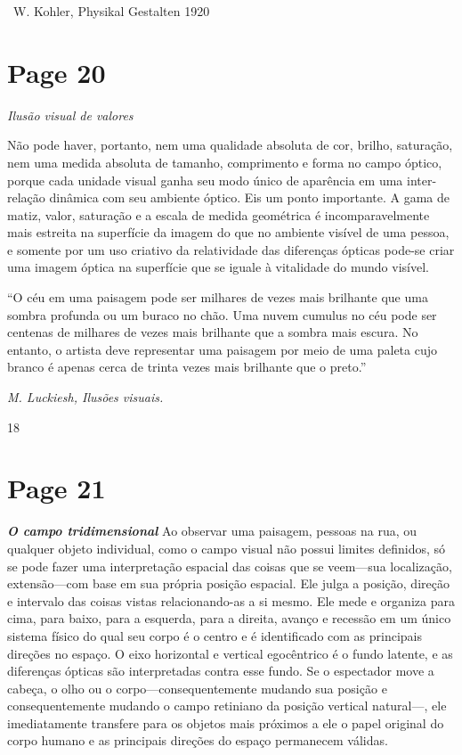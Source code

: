 \documentclass[a4paper]{article}
\begin{document}
\textbullet\ W. Kohler, Physikal Gestalten 1920

\newpage
\section*{Page 20}

\textit{Ilusão visual de valores}

Não pode haver, portanto, nem uma qualidade absoluta de cor, brilho, saturação, nem uma medida absoluta de tamanho, comprimento e forma no campo óptico, porque cada unidade visual ganha seu modo único de aparência em uma inter-relação dinâmica com seu ambiente óptico. Eis um ponto importante. A gama de matiz, valor, saturação e a escala de medida geométrica é incomparavelmente mais estreita na superfície da imagem do que no ambiente visível de uma pessoa, e somente por um uso criativo da relatividade das diferenças ópticas pode-se criar uma imagem óptica na superfície que se iguale à vitalidade do mundo visível.

``O céu em uma paisagem pode ser milhares de vezes mais brilhante que uma sombra profunda ou um buraco no chão. Uma nuvem cumulus no céu pode ser centenas de milhares de vezes mais brilhante que a sombra mais escura. No entanto, o artista deve representar uma paisagem por meio de uma paleta cujo branco é apenas cerca de trinta vezes mais brilhante que o preto.''

\textit{M. Luckiesh, Ilusões visuais.}

18

\newpage
\section*{Page 21}

\textbf{\textit{O campo tridimensional}}
Ao observar uma paisagem, pessoas na rua, ou qualquer objeto individual, como o campo visual não possui limites definidos, só se pode fazer uma interpretação espacial das coisas que se veem---sua localização, extensão---com base em sua própria posição espacial. Ele julga a posição, direção e intervalo das coisas vistas relacionando-as a si mesmo. Ele mede e organiza para cima, para baixo, para a esquerda, para a direita, avanço e recessão em um único sistema físico do qual seu corpo é o centro e é identificado com as principais direções no espaço. O eixo horizontal e vertical egocêntrico é o fundo latente, e as diferenças ópticas são interpretadas contra esse fundo. Se o espectador move a cabeça, o olho ou o corpo---consequentemente mudando sua posição e consequentemente mudando o campo retiniano da posição vertical natural---, ele imediatamente transfere para os objetos mais próximos a ele o papel original do corpo humano e as principais direções do espaço permanecem válidas.
\end{document}
